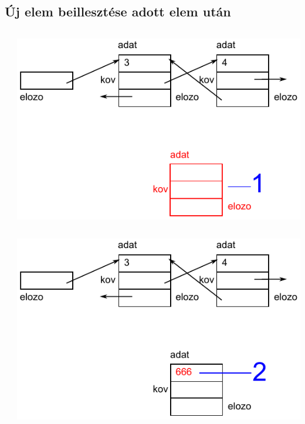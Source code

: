 \subsection{Új elem beillesztése adott elem után}
\begin{frame}
  \begin{columns}[c]
      \scriptsize
      \begin{exampleblock}{}
        \vspace{-.2cm}
        
        \vspace{-.2cm}
    \end{exampleblock}
      \includegraphics[width=\textwidth]{lista2/list2-1.pdf}
  \end{columns}
\end{frame}

\begin{frame}
  \begin{columns}[c]
      \scriptsize
      \begin{exampleblock}{}
        \vspace{-.2cm}
        
        \vspace{-.2cm}
    \end{exampleblock}
      \includegraphics[width=\textwidth]{lista2/list2-2.pdf}
  \end{columns}
\end{frame}

